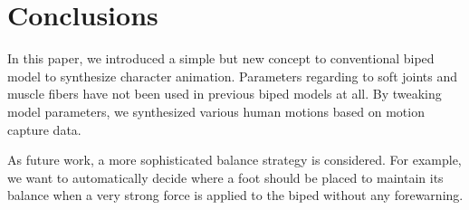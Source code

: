 \documentclass{acm_proc_article-sp}
\begin{document}
\section{Conclusions}
In this paper, we introduced a simple but new concept to
conventional biped model to synthesize character animation.
Parameters regarding to soft joints and muscle fibers have
not been used in previous biped models at all.
By tweaking model parameters, we synthesized various human
motions based on motion capture data.

As future work, a more sophisticated balance strategy is
considered. For example, we want to automatically decide
where a foot should be placed to maintain its balance
when a very strong force is applied to the biped
without any forewarning.

%

%
%

\balancecolumns
\end{document}
